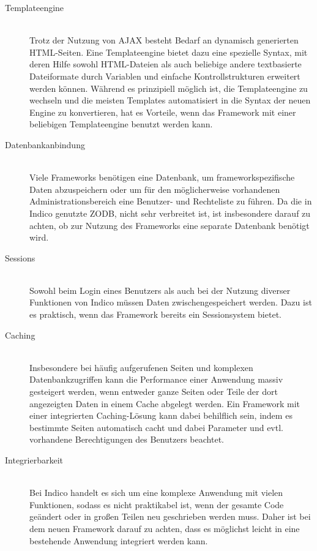 \begin{description}
\item[Templateengine] \hfill \\
Trotz der Nutzung von AJAX besteht Bedarf an dynamisch generierten HTML-Seiten. Eine Templateengine
bietet dazu eine spezielle Syntax, mit deren Hilfe sowohl HTML-Dateien als auch beliebige andere
textbasierte Dateiformate durch Variablen und einfache Kontrollstrukturen erweitert werden können.
Während es prinzipiell möglich ist, die Templateengine zu wechseln und die meisten Templates
automatisiert in die Syntax der neuen Engine zu konvertieren, hat es Vorteile, wenn das Framework
mit einer beliebigen Templateengine benutzt werden kann.

\item[Datenbankanbindung] \hfill \\
Viele Frameworks benötigen eine Datenbank, um frameworkspezifische Daten abzuspeichern oder um für
den möglicherweise vorhandenen Administrationsbereich eine Benutzer- und Rechteliste zu führen. Da
die in Indico genutzte ZODB, nicht sehr verbreitet ist, ist insbesondere darauf zu achten, ob zur
Nutzung des Frameworks eine separate Datenbank benötigt wird.

\item[Sessions] \hfill \\
Sowohl beim Login eines Benutzers als auch bei der Nutzung diverser Funktionen von Indico müssen
Daten zwischengespeichert werden. Dazu ist es praktisch, wenn das Framework bereits ein
Sessionsystem bietet.

\item[Caching] \hfill \\
Insbesondere bei häufig aufgerufenen Seiten und komplexen Datenbankzugriffen kann die Performance
einer Anwendung massiv gesteigert werden, wenn entweder ganze Seiten oder Teile der dort
angezeigten Daten in einem Cache abgelegt werden. Ein Framework mit einer integrierten
Caching-Lösung kann dabei behilflich sein, indem es bestimmte Seiten automatisch
cacht und dabei Parameter und evtl. vorhandene Berechtigungen des Benutzers beachtet.

\item[Integrierbarkeit] \hfill \\
Bei Indico handelt es sich um eine komplexe Anwendung mit vielen Funktionen, sodass es nicht
praktikabel ist, wenn der gesamte Code geändert oder in großen Teilen neu geschrieben werden muss.
Daher ist bei dem neuen Framework darauf zu achten, dass es möglichst leicht in eine bestehende
Anwendung integriert werden kann.


\end{description}
